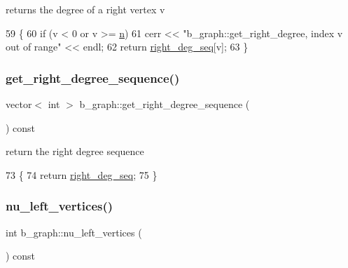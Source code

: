 returns the degree of a right vertex v 


\begin{DoxyCode}
59 \{
60   \textcolor{keywordflow}{if} (v < 0 or v >= \hyperlink{classb__graph_a9e211d40c1799bc9b125de472ff06642}{n})
61     cerr << \textcolor{stringliteral}{"b\_graph::get\_right\_degree, index v out of range"} << endl;
62   \textcolor{keywordflow}{return} \hyperlink{classb__graph_ae4c875ed6a583a78f38dfe958f20fad5}{right\_deg\_seq}[v];
63 \}
\end{DoxyCode}
\mbox{\label{classb__graph_a2711566385b92b02f4c03abdc1f9a582}} 
\subsubsection{\texorpdfstring{get\+\_\+right\+\_\+degree\+\_\+sequence()}{get\_right\_degree\_sequence()}}
{\footnotesize\ttfamily vector$<$ int $>$ b\+\_\+graph\+::get\+\_\+right\+\_\+degree\+\_\+sequence (\begin{DoxyParamCaption}{ }\end{DoxyParamCaption}) const}



return the right degree sequence 


\begin{DoxyCode}
73 \{
74   \textcolor{keywordflow}{return} \hyperlink{classb__graph_ae4c875ed6a583a78f38dfe958f20fad5}{right\_deg\_seq};
75 \}
\end{DoxyCode}
\mbox{\label{classb__graph_a5e71d5c97f2501b0b93c17146cf7e68e}} 
\subsubsection{\texorpdfstring{nu\+\_\+left\+\_\+vertices()}{nu\_left\_vertices()}}
{\footnotesize\ttfamily int b\+\_\+graph\+::nu\+\_\+left\+\_\+vertices (\begin{DoxyParamCaption}{ }\end{DoxyParamCaption}) const}



